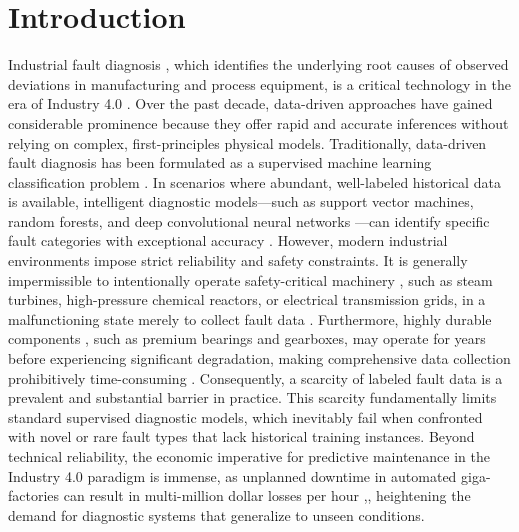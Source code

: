 \section{Introduction}

Industrial fault diagnosis \cite{precup2015overview}, which identifies the underlying root causes of observed deviations in manufacturing and process equipment, is a critical technology in the era of Industry 4.0 \cite{precup2015overview}. Over the past decade, data-driven approaches have gained considerable prominence because they offer rapid and accurate inferences without relying on complex, first-principles physical models. Traditionally, data-driven fault diagnosis \cite{zhao2021semisupervised} has been formulated as a supervised machine learning classification problem \cite{zhao2021semisupervised,du2023fault} \cite{wang2020deep}. In scenarios where abundant, well-labeled historical data is available, intelligent diagnostic models—such as support vector machines, random forests, and deep convolutional neural networks \cite{he2016deep,vaswani2017attention,he2022transformer}—can identify specific fault categories with exceptional accuracy \cite{wang2020deep}. However, modern industrial environments impose strict reliability and safety constraints. It is generally impermissible to intentionally operate safety-critical machinery \cite{lee2014prognostics}, such as steam turbines, high-pressure chemical reactors, or electrical transmission grids, in a malfunctioning state merely to collect fault data \cite{wang2020deep}. Furthermore, highly durable components \cite{zhang2022intelligent}, such as premium bearings and gearboxes, may operate for years before experiencing significant degradation, making comprehensive data collection prohibitively time-consuming \cite{wang2020deep}. Consequently, a scarcity of labeled fault data is a prevalent and substantial barrier in practice. This scarcity fundamentally limits standard supervised diagnostic models, which inevitably fail when confronted with novel or rare fault types that lack historical training instances. Beyond technical reliability, the economic imperative for predictive maintenance in the Industry 4.0 paradigm is immense, as unplanned downtime in automated giga-factories can result in multi-million dollar losses per hour \cite{zheng2024knowledge,wu2024semantic},, heightening the demand for diagnostic systems that generalize to unseen conditions.

